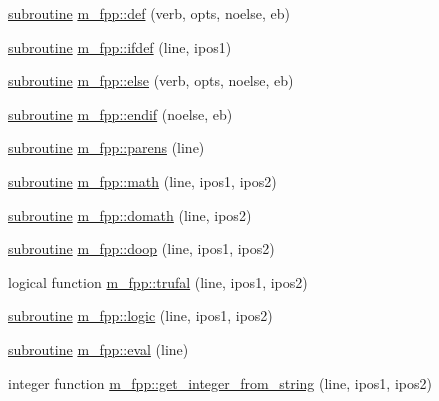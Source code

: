 \begin{DoxyCompactItemize}
\item 
\hyperlink{M__stopwatch_83_8txt_acfbcff50169d691ff02d4a123ed70482}{subroutine} \hyperlink{namespacem__fpp_af80169d1e05b926eed9d4dbe10963084}{m\+\_\+fpp\+::def} (verb, opts, noelse, eb)
\item 
\hyperlink{M__stopwatch_83_8txt_acfbcff50169d691ff02d4a123ed70482}{subroutine} \hyperlink{namespacem__fpp_acc125ade915dbf457a06801f2e241306}{m\+\_\+fpp\+::ifdef} (line, ipos1)
\item 
\hyperlink{M__stopwatch_83_8txt_acfbcff50169d691ff02d4a123ed70482}{subroutine} \hyperlink{namespacem__fpp_aa7ce8afa566111e9b6f86922b9ec3205}{m\+\_\+fpp\+::else} (verb, opts, noelse, eb)
\item 
\hyperlink{M__stopwatch_83_8txt_acfbcff50169d691ff02d4a123ed70482}{subroutine} \hyperlink{namespacem__fpp_a943f646c7373dc0d88d4e6fe905fd90f}{m\+\_\+fpp\+::endif} (noelse, eb)
\item 
\hyperlink{M__stopwatch_83_8txt_acfbcff50169d691ff02d4a123ed70482}{subroutine} \hyperlink{namespacem__fpp_a4b9be76f637b58b358ee2a9ec95db933}{m\+\_\+fpp\+::parens} (line)
\item 
\hyperlink{M__stopwatch_83_8txt_acfbcff50169d691ff02d4a123ed70482}{subroutine} \hyperlink{namespacem__fpp_a7fe1c908c17895ebaa5afc2dc4cd1f1f}{m\+\_\+fpp\+::math} (line, ipos1, ipos2)
\item 
\hyperlink{M__stopwatch_83_8txt_acfbcff50169d691ff02d4a123ed70482}{subroutine} \hyperlink{namespacem__fpp_acf16ae34a4c7e769114656c3dbbe0640}{m\+\_\+fpp\+::domath} (line, ipos2)
\item 
\hyperlink{M__stopwatch_83_8txt_acfbcff50169d691ff02d4a123ed70482}{subroutine} \hyperlink{namespacem__fpp_a56d098fa1c69f9afbfbf0aacceed9fff}{m\+\_\+fpp\+::doop} (line, ipos1, ipos2)
\item 
logical function \hyperlink{namespacem__fpp_ad7c4d8aa34d0b35cd3b3ced65e261590}{m\+\_\+fpp\+::trufal} (line, ipos1, ipos2)
\item 
\hyperlink{M__stopwatch_83_8txt_acfbcff50169d691ff02d4a123ed70482}{subroutine} \hyperlink{namespacem__fpp_ae036546bab009c772421d3f4e34ca93c}{m\+\_\+fpp\+::logic} (line, ipos1, ipos2)
\item 
\hyperlink{M__stopwatch_83_8txt_acfbcff50169d691ff02d4a123ed70482}{subroutine} \hyperlink{namespacem__fpp_a7f223128c476778fa0334675c1431371}{m\+\_\+fpp\+::eval} (line)
\item 
integer function \hyperlink{namespacem__fpp_a3293bb9a959675261bda2b8f6fe3fa9e}{m\+\_\+fpp\+::get\+\_\+integer\+\_\+from\+\_\+string} (line, ipos1, ipos2)

\end{DoxyCompactItemize}
